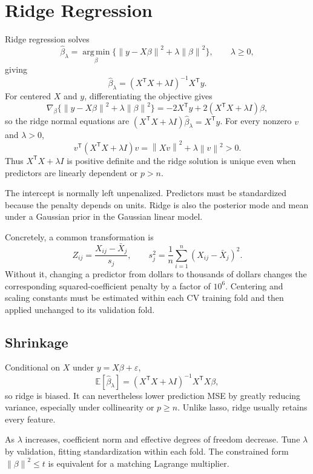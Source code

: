 \documentclass[12pt,oneside]{book}
\numberwithin{equation}{section}
\theoremstyle{definition}
\theoremstyle{plain}
\theoremstyle{remark}
\newcommand{\E}{\mathbb{E}}
\newcommand{\argmin}{\operatorname*{arg\,min}}
\newcommand{\norm}[1]{\left\lVert #1 \right\rVert}
\begin{document}
\section{Ridge Regression}

Ridge regression solves
\begin{equation}
 \widehat\beta_\lambda
 =\argmin_\beta\{\norm{y-X\beta}^2+\lambda\norm\beta^2\},
 \qquad\lambda\geq0,
 \label{eq:ridge-objective}
\end{equation}
giving
\[
    \widehat\beta_\lambda=(X^\mathsf TX+\lambda I)^{-1}X^\mathsf Ty.
\]
For centered $X$ and $y$, differentiating the objective gives
\[
 \nabla_\beta\{\norm{y-X\beta}^2+\lambda\norm\beta^2\}
 =-2X^\mathsf Ty+2(X^\mathsf TX+\lambda I)\beta,
\]
so the ridge normal equations are
$(X^\mathsf TX+\lambda I)\widehat\beta_\lambda=X^\mathsf Ty$.
For every nonzero $v$ and $\lambda>0$,
\[
 v^\mathsf T(X^\mathsf TX+\lambda I)v
 =\norm{Xv}^2+\lambda\norm v^2>0.
\]
Thus $X^\mathsf TX+\lambda I$ is positive definite and the ridge solution is
unique even when predictors are linearly dependent or $p>n$.

The intercept is normally left unpenalized. Predictors must be standardized
because the penalty depends on units. Ridge is also the posterior mode and
mean under a Gaussian prior in the Gaussian linear model.

Concretely, a common transformation is
\[
 Z_{ij}=\frac{X_{ij}-\bar X_j}{s_j},
 \qquad
 s_j^2=\frac1n\sum_{i=1}^n(X_{ij}-\bar X_j)^2.
\]
Without it, changing a predictor from dollars to thousands of dollars changes
the corresponding squared-coefficient penalty by a factor of $10^6$.
Centering and scaling constants must be estimated within each CV training
fold and then applied unchanged to its validation fold.

\subsection{Shrinkage}

Conditional on $X$ under $y=X\beta+\varepsilon$,
\[
 \E[\widehat\beta_\lambda]
 =(X^\mathsf TX+\lambda I)^{-1}X^\mathsf TX\beta,
\]
so ridge is biased. It can nevertheless lower prediction MSE by greatly
reducing variance, especially under collinearity or $p\geq n$. Unlike lasso,
ridge usually retains every feature.

As $\lambda$ increases, coefficient norm and effective degrees of freedom
decrease. Tune $\lambda$ by validation, fitting standardization within each
fold. The constrained form $\norm\beta^2\leq t$ is equivalent for a matching
Lagrange multiplier.
\end{document}
